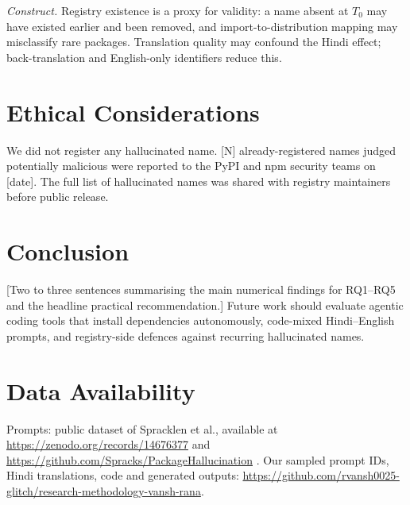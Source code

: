 \documentclass[conference]{IEEEtran}
\begin{document}
\textit{Construct.} Registry existence is a proxy for validity: a name absent at $T_0$ may have existed earlier and been removed, and import-to-distribution mapping may misclassify rare packages. Translation quality may confound the Hindi effect; back-translation and English-only identifiers reduce this.

\section{Ethical Considerations}
We did not register any hallucinated name. [N] already-registered names judged potentially malicious were reported to the PyPI and npm security teams on [date]. The full list of hallucinated names was shared with registry maintainers before public release.

\section{Conclusion}
[Two to three sentences summarising the main numerical findings for RQ1--RQ5 and the headline practical recommendation.] Future work should evaluate agentic coding tools that install dependencies autonomously, code-mixed Hindi--English prompts, and registry-side defences against recurring hallucinated names.

\section*{Data Availability}
Prompts: public dataset of Spracklen et al., available at \url{https://zenodo.org/records/14676377} and \url{https://github.com/Spracks/PackageHallucination} \cite{dataset2025}. Our sampled prompt IDs, Hindi translations, code and generated outputs: \url{https://github.com/rvansh0025-glitch/research-methodology-vansh-rana}.
\end{document}
